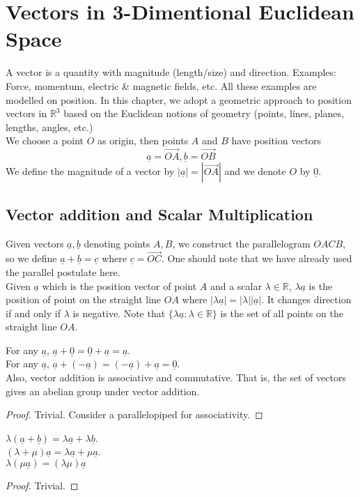 \section{Vectors in 3-Dimentional Euclidean Space}
A vector is a quantity with magnitude (length/size) and direction.
Examples: Force, momentum, electric \& magnetic fields, etc.
All these examples are modelled on position.
In this chapter, we adopt a geometric approach to position vectors in $\mathbb R^3$ based on the Euclidean notions of geometry (points, lines, planes, lengths, angles, etc.)\\
We choose a point $O$ as origin, then points $A$ and $B$ have position vectors
$$\underline{a}=\overrightarrow{OA}, \underline{b}=\overrightarrow{OB}$$
We define the magnitude of a vector by $|\underline{a}|=|\overrightarrow{OA}|$ and we denote $O$ by $\underline{0}$.
\subsection{Vector addition and Scalar Multiplication}
Given vectors $\underline{a},\underline{b}$ denoting points $A,B$, we construct the parallelogram $OACB$, so we define $\underline{a}+\underline{b}=\underline{c}$ where $\underline{c}=\overrightarrow{OC}$.
One should note that we have already used the parallel postulate here.\\
Given $\underline{a}$ which is the position vector of point $A$ and a scalar $\lambda\in\mathbb R$, $\lambda\underline{a}$ is the position of point on the straight line $OA$ where $|\lambda\underline{a}|=|\lambda||\underline{a}|$.
It changes direction if and only if $\lambda$ is negative.
Note that $\{\lambda\underline{a}:\lambda\in\mathbb R\}$ is the set of all points on the straight line $OA$.
\begin{proposition}
    For any $\underline{a}$, $\underline{a}+\underline{0}=\underline{0}+\underline{a}=\underline{a}$.\\
    For any $\underline{a}$, $\underline{a}+(-\underline{a})=(-\underline{a})+\underline{a}=\underline{0}$.\\
    Also, vector addition is associative and commutative.
    That is, the set of vectors gives an abelian group under vector addition.
\end{proposition}
\begin{proof}
    Trivial. Consider a parallelopiped for associativity.
\end{proof}
\begin{proposition}
    $\lambda(\underline{a}+\underline{b})=\lambda\underline{a}+\lambda\underline{b}$.\\
    $(\lambda+\mu)\underline{a}=\lambda\underline{a}+\mu\underline{a}$.\\
    $\lambda(\mu\underline{a})=(\lambda\mu)\underline{a}$
\end{proposition}
\begin{proof}
    Trivial.
\end{proof}

